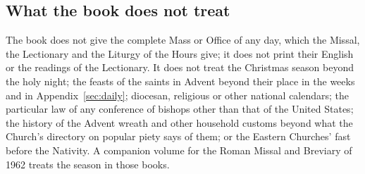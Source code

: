 \subsection{What the book does not treat}

The book does not give the complete Mass or Office of any day, which the
Missal, the Lectionary and the Liturgy of the Hours give; it does not print
their English or the readings of the Lectionary. It does not treat the
Christmas season beyond the holy night; the feasts of the saints in Advent
beyond their place in the weeks and in Appendix~\ref{sec:daily}; diocesan,
religious or other national calendars; the particular law of any conference of
bishops other than that of the United States; the history of the Advent wreath
and other household customs beyond what the Church's directory on popular piety
says of them; or the Eastern Churches' fast before the Nativity. A companion
volume for the Roman Missal and Breviary of 1962 treats the season in those
books.
